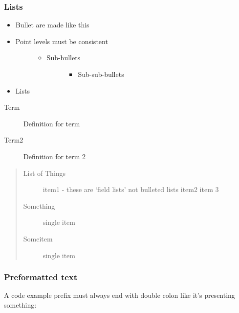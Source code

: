 \documentclass[letterpaper,10pt,english]{sphinxmanual}
\begin{document}
\subsubsection{Lists}
\label{\detokenize{sample:lists}}\begin{itemize}
\item {} 
Bullet are made like this

\item {} \begin{description}
\item[{Point levels must be consistent}] \leavevmode\begin{itemize}
\item {} \begin{description}
\item[{Sub-bullets}] \leavevmode\begin{itemize}
\item {} 
Sub-sub-bullets

\end{itemize}

\end{description}

\end{itemize}

\end{description}

\item {} 
Lists

\end{itemize}
\begin{description}
\item[{Term}] \leavevmode
Definition for term

\item[{Term2}] \leavevmode
Definition for term 2

\end{description}
\begin{quote}\begin{description}
\item[{List of Things}] \leavevmode
item1 - these are ‘field lists’ not bulleted lists
item2
item 3

\item[{Something}] \leavevmode
single item

\item[{Someitem}] \leavevmode
single item

\end{description}\end{quote}


\subsubsection{Preformatted text}
\label{\detokenize{sample:preformatted-text}}
A code example prefix must always end with double colon like it’s presenting something:
\end{document}
